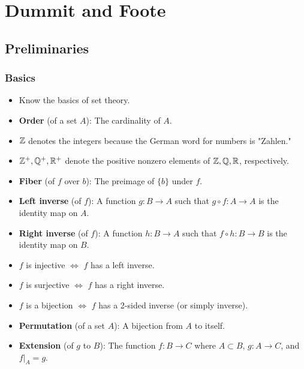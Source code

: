 \documentclass[../notes.tex]{subfiles}
\begin{document}
\part{Dummit and Foote}\thispagestyle{main}
\setcounter{chapter}{-1}
\chapter{Preliminaries}
\section{Basics}
\begin{itemize}
    \item {}Know the basics of set theory.
    \item \textbf{Order} (of a set $A$): The cardinality of $A$.
    \item $\mathbb{Z}$ denotes the integers because the German word for numbers is "Zahlen."
    \item $\mathbb{Z}^+,\mathbb{Q}^+,\mathbb{R}^+$ denote the positive nonzero elements of $\mathbb{Z},\mathbb{Q},\mathbb{R}$, respectively.
    \item \textbf{Fiber} (of $f$ over $b$): The preimage of $\{b\}$ under $f$.
    \item \textbf{Left inverse} (of $f$): A function $g:B\to A$ such that $g\circ f:A\to A$ is the identity map on $A$.
    \item \textbf{Right inverse} (of $f$): A function $h:B\to A$ such that $f\circ h:B\to B$ is the identity map on $B$.
    \item {}$f$ is injective $\Longleftrightarrow$ $f$ has a left inverse.
    \item $f$ is surjective $\Longleftrightarrow$ $f$ has a right inverse.
    \item $f$ is a bijection $\Longleftrightarrow$ $f$ has a 2-sided inverse (or simply inverse).
    \item \textbf{Permutation} (of a set $A$): A bijection from $A$ to itself.
    \item \textbf{Extension} (of $g$ to $B$): The function $f:B\to C$ where $A\subset B$, $g:A\to C$, and $f|_A=g$.
\end{itemize}
\end{document}
